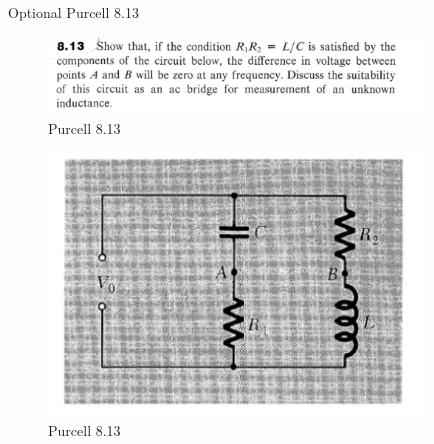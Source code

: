 \documentclass[makesolutionspdf]{esg8022pset}
\begin{document}
\begin{problem}{ Optional Purcell 8.13}
  \begin{figure}[H]
    \centering
    \includegraphics[width = 10cm]{pu813}
    \caption{Purcell 8.13}
  \end{figure}
  
  \begin{figure}[H]
    \centering
    \includegraphics[width = 10cm]{figpu813}
    \caption{Purcell 8.13}
  \end{figure}
\end{problem}
\end{document}
